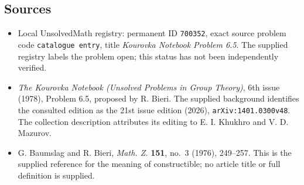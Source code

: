 \documentclass[11pt]{article}
\begin{document}
\subsection{Sources}
\begin{itemize}
\item Local UnsolvedMath registry: permanent ID \texttt{700352}, exact source problem code \texttt{catalogue entry}, title \emph{Kourovka Notebook Problem 6.5}. The supplied registry labels the problem open; this status has not been independently verified.
\item \emph{The Kourovka Notebook (Unsolved Problems in Group Theory)}, 6th issue (1978), Problem 6.5, proposed by R. Bieri. The supplied background identifies the consulted edition as the 21st issue edition (2026), \texttt{arXiv:1401.0300v48}. The collection description attributes its editing to E. I. Khukhro and V. D. Mazurov.
\item G. Baumslag and R. Bieri, \emph{Math. Z.} \textbf{151}, no.~3 (1976), 249--257. This is the supplied reference for the meaning of constructible; no article title or full definition is supplied.
\end{itemize}
\end{document}
